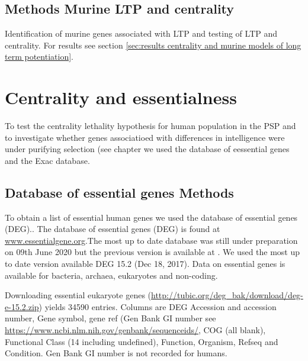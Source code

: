 \subsection{Methods Murine LTP and centrality}
Identification of murine genes associated with LTP and testing of LTP and centrality. For results see section \ref{sec:results centrality and murine models of long term potentiation}.


\section{Centrality and essentialness}
To test the centrality lethality hypothesis for human population in the PSP and to investigate whether genes associatioed with differences in intelligence were under purifying selection (see chapter  we used the database of eessential genes and the Exac database. 

\subsection{Database of essential genes Methods}
 \label{sec:Database of essential genes}
 
 To obtain a list of essential human genes we used the database of essential genes (DEG).\cite{luo2014deg}. The database of essential genes (DEG) is found at \url{www.essentialgene.org}.The most up to date database was still under preparation on 09th June 2020 but the previous version is available at \cite{ http://tubic.org/deg_bak/}. We used the most up to date version available DEG 15.2 (Dec 18, 2017). Data on essential genes is available for bacteria, archaea, eukaryotes and non-coding.
 
  Downloading essential eukaryote genes (\url{http://tubic.org/deg_bak/download/deg-e-15.2.zip}) yields 34590 entries. Columns are DEG Accession and  accession number, Gene symbol, gene ref (Gen Bank GI number see \url{https://www.ncbi.nlm.nih.gov/genbank/sequenceids/}, COG (all blank), Functional Class (14 including undefined), Function, Organism, Refseq and Condition. Gen Bank GI number is not recorded for humans.
  
